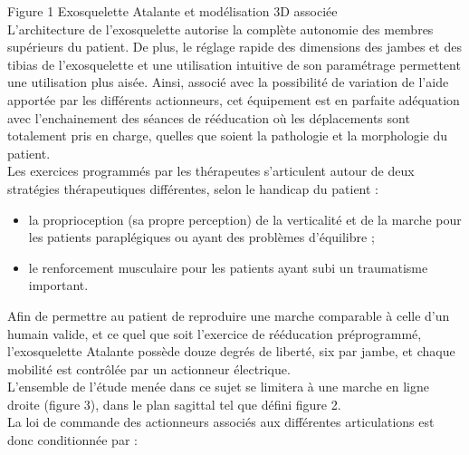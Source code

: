 \documentclass[10pt]{article}
\begin{document}
Figure 1 Exosquelette Atalante et modélisation 3D associée\\
L'architecture de l'exosquelette autorise la complète autonomie des membres supérieurs du patient. De plus, le réglage rapide des dimensions des jambes et des tibias de l'exosquelette et une utilisation intuitive de son paramétrage permettent une utilisation plus aisée. Ainsi, associé avec la possibilité de variation de l'aide apportée par les différents actionneurs, cet équipement est en parfaite adéquation avec l'enchainement des séances de rééducation où les déplacements sont totalement pris en charge, quelles que soient la pathologie et la morphologie du patient.\\
Les exercices programmés par les thérapeutes s'articulent autour de deux stratégies thérapeutiques différentes, selon le handicap du patient :

\begin{itemize}
  \item la proprioception (sa propre perception) de la verticalité et de la marche pour les patients paraplégiques ou ayant des problèmes d'équilibre ;
  \item le renforcement musculaire pour les patients ayant subi un traumatisme important.
\end{itemize}

Afin de permettre au patient de reproduire une marche comparable à celle d'un humain valide, et ce quel que soit l'exercice de rééducation préprogrammé, l'exosquelette Atalante possède douze degrés de liberté, six par jambe, et chaque mobilité est contrôlée par un actionneur électrique.\\
L'ensemble de l'étude menée dans ce sujet se limitera à une marche en ligne droite (figure 3), dans le plan sagittal tel que défini figure 2.\\
La loi de commande des actionneurs associés aux différentes articulations est donc conditionnée par :
\end{document}
